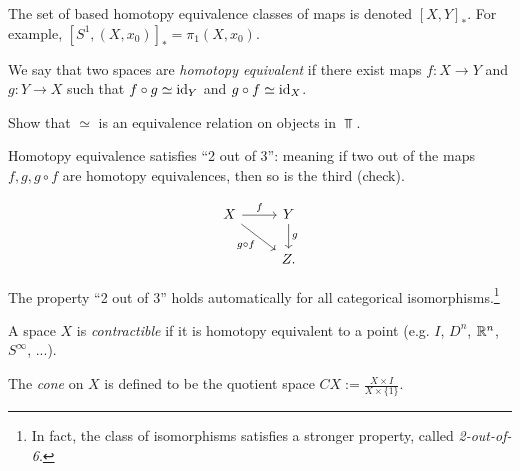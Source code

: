 \documentclass{article}[11pt]
\begin{document}
\begin{notation} The set of based homotopy equivalence classes of maps is denoted $[X,Y]_\ast$. For example, $[S^1, (X,x_0)]_\ast = \pi_1(X,x_0)$.
\end{notation}

\begin{definition} We say that two spaces are \textit{homotopy equivalent} if there exist maps $f: X \to Y$ and $g : Y \to X$ such that $f\circ g\simeq \text{id}_Y$ and $g\circ f \simeq \text{id}_X$.
\end{definition}

\begin{exercise} Show that $\simeq$ is an equivalence relation on objects in $\Top$.
\end{exercise}

\begin{proposition} Homotopy equivalence satisfies ``2 out of 3'': meaning if two out of the maps $f, g, g\circ f$ are homotopy equivalences, then so is the third (check).

\[
	\begin{tikzcd}
	X\rar["f"]\ar[dr,"g\circ f" below left] & Y\dar["g" right] \\
	 & Z.
	\end{tikzcd}
\]

\begin{note} The property ``2 out of 3'' holds automatically for all categorical isomorphisms.\footnote{In fact, the class of isomorphisms satisfies a stronger property, called \textit{2-out-of-6}.}
\end{note}

\end{proposition}

\begin{definition} A space $X$ is \textit{contractible} if it is homotopy equivalent to a point (e.g. $I$, $D^n$, $\mathbb{R}^n$, $S^\infty$, ...).
\end{definition}

\begin{definition} The \textit{cone} on $X$ is defined to be the quotient space $CX := \frac{X\times I}{X\times \{1\}}$.
\end{definition}
\end{document}
